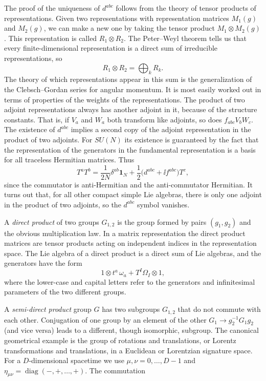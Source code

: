 The proof of the uniqueness of $d^{abc}$ follows from the theory of tensor
products of representations. Given two representations with representation
matrices $M_1(g)$ and $M_2(g)$, we can make a new one by taking the tensor
product $M_1\otimes M_2(g)$. This representation is called $R_1\otimes R_2$.
The Peter--Weyl theorem tells us that every finite-dimensional representation
is a direct sum of irreducible representations, so
\begin{equation*}
  R_1\otimes R_2=\bigoplus_k R_k.
\end{equation*}
The theory of which representations appear in this sum is the generalization
of the Clebsch--Gordan series for angular momentum. It is most easily worked
out in terms of properties of the weights of the representations. The product
of two adjoint representations always has another adjoint in it, because of
the structure constants. That is, if $V_a$ and $W_a$ both transform like
adjoints, so does $f_{abc}V_bW_c$. The existence of $d^{abc}$ implies a second
copy of the adjoint representation in the product of two adjoints. For $SU(N)$
its existence is guaranteed by the fact that the representation of the
generators in the fundamental representation is a basis for all traceless
Hermitian matrices. Thus
\begin{equation*}
  T^aT^b=\frac{1}{2N}\delta^{ab}\mathbf1_N
  +\frac12\bigl(d^{abc}+\ii f^{abc}\bigr)T^c,
\end{equation*}
since the commutator is anti-Hermitian and the anti-commutator Hermitian. It
turns out that, for all other compact simple Lie algebras, there is only one
adjoint in the product of two adjoints, so the $d^{abc}$ symbol vanishes.


A \emph{direct product} of two groups $G_{1,2}$ is the group formed by pairs
$(g_1,g_2)$ and the obvious multiplication law. In a matrix representation the
direct product matrices are tensor products acting on independent indices in
the representation space. The Lie algebra of a direct product is a direct sum
of Lie algebras, and the generators have the form
\begin{equation*}
  1\otimes t^a\,\omega_a+T^I\Omega_I\otimes1,
\end{equation*}
where the lower-case and capital letters refer to the generators and
infinitesimal parameters of the two different groups.

A \emph{semi-direct product} group $G$ has two subgroups $G_{1,2}$ that do not
commute with each other. Conjugation of one group by an element of the other
$G_1\to g_2^{-1}G_1g_2$ (and vice versa) leads to a different, though
isomorphic, subgroup. The canonical geometrical example is the group of
rotations and translations, or Lorentz transformations and translations, in a
Euclidean or Lorentzian signature space. For a $D$-dimensional spacetime we use
$\mu,\nu=0,\ldots,D-1$ and
$\eta_{\mu\nu}=\operatorname{diag}(-,+,\ldots,+)$. The commutation

